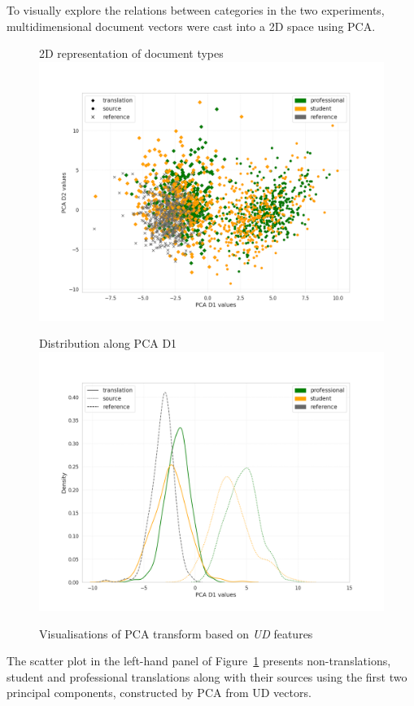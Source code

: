 To visually explore the relations between categories in the two experiments, multidimensional document vectors  were cast into a 2D space using PCA. 

\begin{figure}[H]
	\begin{minipage}[c]{0.5\linewidth}
		\centering
		2D representation of document types
		\includegraphics[width=\linewidth]{figures/pca/src-var-ttype-ud-PCA-scatter}
	\end{minipage}	
	\begin{minipage}[c]{0.5\linewidth}
		\centering
		Distribution along PCA D1
		\includegraphics[width=\linewidth]{figures/pca/src-var-ttype-ud-PCA-D1-lines}
	\end{minipage}
	\caption{\label{fig:vars-ud}Visualisations of PCA transform based on \textit{UD} features}	
\end{figure}
The scatter plot in the left-hand panel of Figure~\ref{fig:vars-ud} presents non-translations, student and professional translations along with their sources using the first two principal components, constructed by PCA from UD vectors.

